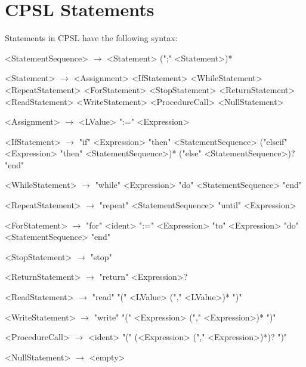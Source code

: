 \documentclass{book}
\begin{document}
\section{CPSL Statements}
Statements in CPSL have the following syntax:
\begin{grammar}
<StatementSequence> $\rightarrow$ <Statement> (";" <Statement>)*

<Statement> $\rightarrow$ <Assignment>
\alt <IfStatement>
\alt <WhileStatement>
\alt <RepeatStatement>
\alt <ForStatement>
\alt <StopStatement>
\alt <ReturnStatement>
\alt <ReadStatement>
\alt <WriteStatement>
\alt <ProcedureCall>
\alt <NullStatement>

<Assignment> $\rightarrow$ <LValue> ":=" <Expression>

<IfStatement> $\rightarrow$ "if" <Expression> "then" <StatementSequence> ("elseif" <Expression> "then" <StatementSequence>)* ("else" <StatementSequence>)? "end"

<WhileStatement> $\rightarrow$ "while" <Expression> "do" <StatementSequence> "end"

<RepeatStatement> $\rightarrow$ "repeat" <StatementSequence> "until" <Expression>

<ForStatement> $\rightarrow$ "for" <ident> ":=" <Expression> "to" <Expression> "do" <StatementSequence> "end"

<StopStatement> $\rightarrow$ "stop"

<ReturnStatement> $\rightarrow$ "return" <Expression>?

<ReadStatement> $\rightarrow$ "read" "(" <LValue> ("," <LValue>)* ")"

<WriteStatement> $\rightarrow$ "write" "(" <Expression> ("," <Expression>)* ")"

<ProcedureCall> $\rightarrow$ <ident> "(" (<Expression> ("," <Expression>)*)? ")"

<NullStatement> $\rightarrow$ <empty>
\end{grammar}
\end{document}
